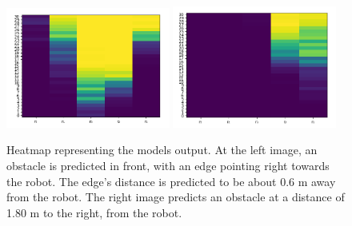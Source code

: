 \begin{figure}[h]%
\centering
\includegraphics[width=0.48\textwidth]{Bilder/heatmap_1.png} 
\hspace{0.2 cm}
\includegraphics[width=0.48\textwidth]{Bilder/heatmap_2.png} 
\caption[]{Heatmap representing the models output. At the left image, an obstacle is predicted in front, with an edge pointing right towards the robot. The edge's distance is predicted to be about 0.6 m away from the robot. The right image predicts an obstacle at a distance of 1.80 m to the right, from the robot.}
\label{heatmap}
\end{figure}
\newpage

